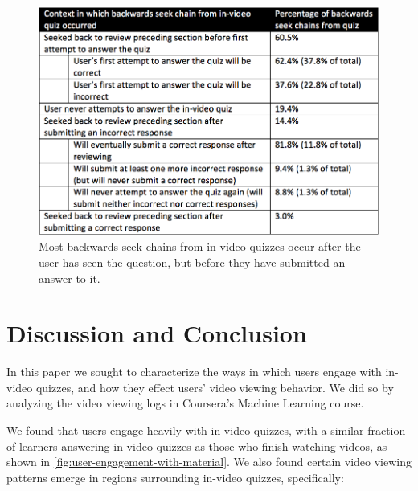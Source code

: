 \documentclass{sigchi}
\begin{document}
\begin{figure}
\includegraphics[width=1.0\columnwidth]{backseeks-and-quizzes}
\caption{Most backwards seek chains from in-video quizzes occur after the user has seen the question, but before they have submitted an answer to it.}
\label{fig:backseeks-and-quizzes}
\end{figure}

\section{Discussion and Conclusion}

In this paper we sought to characterize the ways in which users engage with in-video quizzes, and how they effect users' video viewing behavior. We did so by analyzing the video viewing logs in Coursera's Machine Learning course.

We found that users engage heavily with in-video quizzes, with a similar fraction of learners answering in-video quizzes as those who finish watching videos, as shown in \autoref{fig:user-engagement-with-material}. We also found certain video viewing patterns emerge in regions surrounding in-video quizzes, specifically: %

\end{document}
